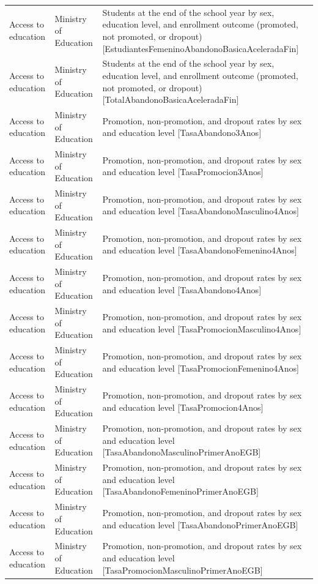 \documentclass[10pt,a4paper]{article}
\begin{document}
\begin{longtable}{@{}>{\raggedright\arraybackslash}p{3.5cm}>{\raggedright\arraybackslash}p{5.6cm}>{\raggedright\arraybackslash}p{\dimexpr\textwidth-9.1cm-4\tabcolsep\relax}@{}}
Access to education & Ministry of Education & Students at the end of the school year by sex, education level, and enrollment outcome (promoted, not promoted, or dropout) [EstudiantesFemeninoAbandonoBasicaAceleradaFin]\\
Access to education & Ministry of Education & Students at the end of the school year by sex, education level, and enrollment outcome (promoted, not promoted, or dropout) [TotalAbandonoBasicaAceleradaFin]\\
Access to education & Ministry of Education & Promotion, non-promotion, and dropout rates by sex and education level [TasaAbandono3Anos]\\
Access to education & Ministry of Education & Promotion, non-promotion, and dropout rates by sex and education level [TasaPromocion3Anos]\\
Access to education & Ministry of Education & Promotion, non-promotion, and dropout rates by sex and education level [TasaAbandonoMasculino4Anos]\\
Access to education & Ministry of Education & Promotion, non-promotion, and dropout rates by sex and education level [TasaAbandonoFemenino4Anos]\\
Access to education & Ministry of Education & Promotion, non-promotion, and dropout rates by sex and education level [TasaAbandono4Anos]\\
Access to education & Ministry of Education & Promotion, non-promotion, and dropout rates by sex and education level [TasaPromocionMasculino4Anos]\\
Access to education & Ministry of Education & Promotion, non-promotion, and dropout rates by sex and education level [TasaPromocionFemenino4Anos]\\
Access to education & Ministry of Education & Promotion, non-promotion, and dropout rates by sex and education level [TasaPromocion4Anos]\\
Access to education & Ministry of Education & Promotion, non-promotion, and dropout rates by sex and education level [TasaAbandonoMasculinoPrimerAnoEGB]\\
Access to education & Ministry of Education & Promotion, non-promotion, and dropout rates by sex and education level [TasaAbandonoFemeninoPrimerAnoEGB]\\
Access to education & Ministry of Education & Promotion, non-promotion, and dropout rates by sex and education level [TasaAbandonoPrimerAnoEGB]\\
Access to education & Ministry of Education & Promotion, non-promotion, and dropout rates by sex and education level [TasaPromocionMasculinoPrimerAnoEGB]\\

\end{longtable}
\end{document}
